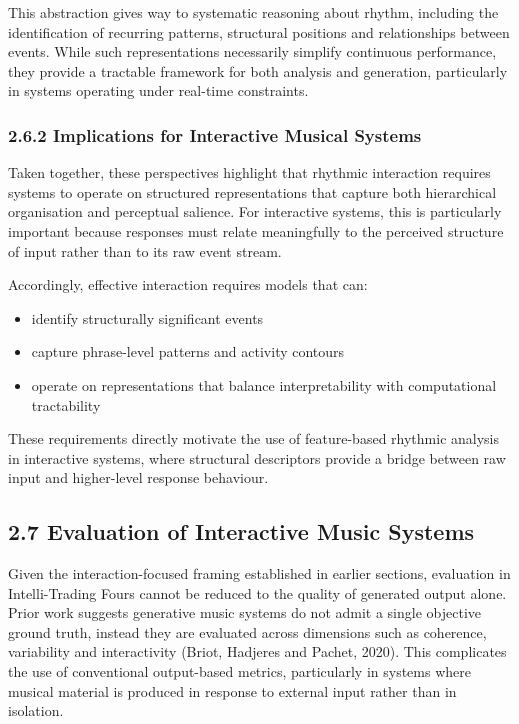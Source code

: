 This abstraction gives way to systematic reasoning about rhythm,
including the identification of recurring patterns, structural positions
and relationships between events. While such representations necessarily
simplify continuous performance, they provide a tractable framework for
both analysis and generation, particularly in systems operating under
real-time constraints.

\subsubsection{2.6.2 Implications for Interactive Musical
Systems}\label{implications-for-interactive-musical-systems}

Taken together, these perspectives highlight that rhythmic interaction
requires systems to operate on structured representations that capture
both hierarchical organisation and perceptual salience. For interactive
systems, this is particularly important because responses must relate
meaningfully to the perceived structure of input rather than to its raw
event stream.

Accordingly, effective interaction requires models that can:

\begin{itemize}
\item
  identify structurally significant events
\item
  capture phrase-level patterns and activity contours
\item
  operate on representations that balance interpretability with
  computational tractability
\end{itemize}

These requirements directly motivate the use of feature-based rhythmic
analysis in interactive systems, where structural descriptors provide a
bridge between raw input and higher-level response behaviour.

\subsection{2.7 Evaluation of Interactive Music
Systems}\label{evaluation-of-interactive-music-systems}

Given the interaction-focused framing established in earlier sections,
evaluation in Intelli-Trading Fours cannot be reduced to the quality of
generated output alone. Prior work suggests generative music systems do
not admit a single objective ground truth, instead they are evaluated
across dimensions such as coherence, variability and interactivity
(Briot, Hadjeres and Pachet, 2020). This complicates the use of
conventional output-based metrics, particularly in systems where musical
material is produced in response to external input rather than in
isolation.

